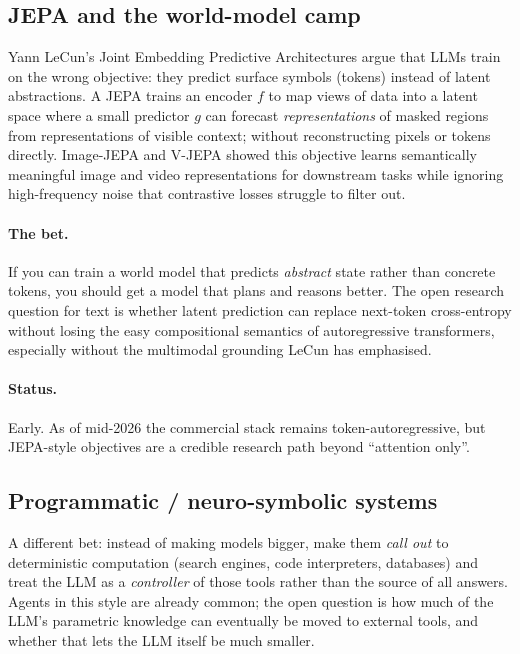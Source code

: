 \subsection{JEPA and the world-model camp}

Yann LeCun's Joint Embedding Predictive Architectures
\citep{lecun2022jepa} argue that LLMs train on the wrong objective: they
predict surface symbols (tokens) instead of latent abstractions. A JEPA
trains an encoder \(f\) to map views of data into a latent space where a
small predictor \(g\) can forecast \emph{representations} of masked
regions from representations of visible context; without reconstructing
pixels or tokens directly. Image-JEPA \citep{assran2023ijepa} and V-JEPA
\citep{bardes2024vjepa} showed this objective learns semantically
meaningful image and video representations for downstream tasks while
ignoring high-frequency noise that contrastive losses struggle to filter
out.

\paragraph{The bet.} If you can train a world model that predicts
\emph{abstract} state rather than concrete tokens, you should get a
model that plans and reasons better. The open research question for text
is whether latent prediction can replace next-token cross-entropy
without losing the easy compositional semantics of autoregressive
transformers, especially without the multimodal grounding LeCun has
emphasised.

\paragraph{Status.} Early. As of mid-2026 the commercial stack remains
token-autoregressive, but JEPA-style objectives are a credible research
path beyond ``attention only''.

\subsection{Programmatic / neuro-symbolic systems}

A different bet: instead of making models bigger, make them \emph{call
out} to deterministic computation (search engines, code interpreters,
databases) and treat the LLM as a \emph{controller} of those tools rather
than the source of all answers. Agents in this style are already common;
the open question is how much of the LLM's parametric knowledge can
eventually be moved to external tools, and whether that lets the LLM
itself be much smaller.

